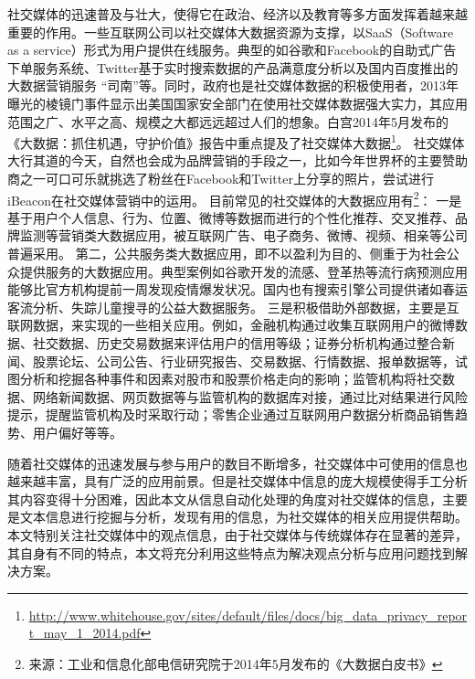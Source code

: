 社交媒体的迅速普及与壮大，使得它在政治、经济以及教育等多方面发挥着越来越重要的作用。一些互联网公司以社交媒体大数据资源为支撑，以SaaS（Software as a service）形式为用户提供在线服务。典型的如谷歌和Facebook的自助式广告下单服务系统、Twitter基于实时搜索数据的产品满意度分析以及国内百度推出的大数据营销服务 “司南”等。同时，政府也是社交媒体数据的积极使用者，2013年曝光的棱镜门事件显示出美国国家安全部门在使用社交媒体数据强大实力，其应用范围之广、水平之高、规模之大都远远超过人们的想象。白宫2014年5月发布的《大数据：抓住机遇，守护价值》报告中重点提及了社交媒体大数据\footnote{\url{http://www.whitehouse.gov/sites/default/files/docs/big\_data\_privacy\_report\_may\_1\_2014.pdf}}。
社交媒体大行其道的今天，自然也会成为品牌营销的手段之一，比如今年世界杯的主要赞助商之一可口可乐就挑选了粉丝在Facebook和Twitter上分享的照片，尝试进行iBeacon在社交媒体营销中的运用。
目前常见的社交媒体的大数据应用有\footnote{来源：工业和信息化部电信研究院于2014年5月发布的《大数据白皮书》}：
一是基于用户个人信息、行为、位置、微博等数据而进行的个性化推荐、交叉推荐、品牌监测等营销类大数据应用，被互联网广告、电子商务、微博、视频、相亲等公司普遍采用。
第二，公共服务类大数据应用，即不以盈利为目的、侧重于为社会公众提供服务的大数据应用。典型案例如谷歌开发的流感、登革热等流行病预测应用能够比官方机构提前一周发现疫情爆发状况。国内也有搜索引擎公司提供诸如春运客流分析、失踪儿童搜寻的公益大数据服务。
三是积极借助外部数据，主要是互联网数据，来实现的一些相关应用。例如，金融机构通过收集互联网用户的微博数据、社交数据、历史交易数据来评估用户的信用等级；证券分析机构通过整合新闻、股票论坛、公司公告、行业研究报告、交易数据、行情数据、报单数据等，试图分析和挖掘各种事件和因素对股市和股票价格走向的影响；监管机构将社交数据、网络新闻数据、网页数据等与监管机构的数据库对接，通过比对结果进行风险提示，提醒监管机构及时采取行动；零售企业通过互联网用户数据分析商品销售趋势、用户偏好等等。

随着社交媒体的迅速发展与参与用户的数目不断增多，社交媒体中可使用的信息也越来越丰富，具有广泛的应用前景。但是社交媒体中信息的庞大规模使得手工分析其内容变得十分困难，因此本文从信息自动化处理的角度对社交媒体的信息，主要是文本信息进行挖掘与分析，发现有用的信息，为社交媒体的相关应用提供帮助。本文特别关注社交媒体中的观点信息，由于社交媒体与传统媒体存在显著的差异，其自身有不同的特点，本文将充分利用这些特点为解决观点分析与应用问题找到解决方案。


